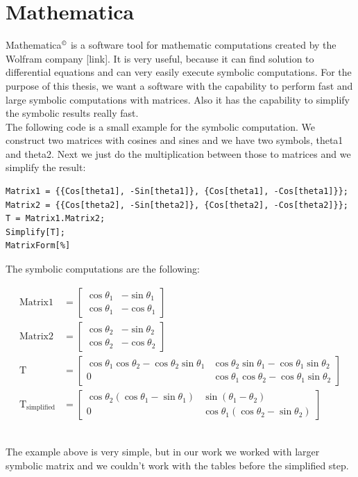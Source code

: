 \section{Mathematica}
Mathematica$^{\textrm{\copyright}}$ is a software tool for mathematic computations created by the Wolfram company [link]. It is very useful, because it can find solution to differential equations and can very easily execute symbolic computations. For the purpose of this thesis, we want a software with the capability to perform fast and large symbolic computations with matrices. Also it has the capability to simplify the symbolic results really fast. \\
The following code is a small example for the symbolic computation. We construct two matrices with cosines and sines and we have two symbols, theta1 and theta2. Next we just do the multiplication between those to matrices and we simplify the result:
\begin{scriptsize}
\begin{verbatim}
Matrix1 = {{Cos[theta1], -Sin[theta1]}, {Cos[theta1], -Cos[theta1]}};
Matrix2 = {{Cos[theta2], -Sin[theta2]}, {Cos[theta2], -Cos[theta2]}};
T = Matrix1.Matrix2;
Simplify[T];
MatrixForm[%]
\end{verbatim}
\end{scriptsize}
The symbolic computations are the following:
\begin{small}
\begin{align*}
\text{Matrix1} &= \begin{bmatrix}
\cos\theta_1 & -\sin\theta_1\\
\cos\theta_1 & -\cos\theta_1
\end{bmatrix}\\
\text{Matrix2} &= \begin{bmatrix}
\cos\theta_2 & -\sin\theta_2\\
\cos\theta_2 & -\cos\theta_2
\end{bmatrix}\\
\text{T} &= \begin{bmatrix}
\cos\theta_1\cos\theta_2 - \cos\theta_2\sin\theta_1 &   \cos\theta_2 \sin\theta_1 - \cos\theta_1 \sin\theta_2\\
0 & \cos\theta_1 \cos\theta_2 - \cos\theta_1 \sin\theta_2
\end{bmatrix}\\
\text{T}_{\text{simplified}} &= \begin{bmatrix}
\cos\theta_2\left(\cos\theta_1 - \sin\theta_1\right) & \sin\left(\theta_1 - \theta_2\right)\\
 0 & \cos\theta_1 \left(\cos\theta_2 - \sin\theta_2\right)
\end{bmatrix}
\end{align*}\\
\end{small}
The example above is very simple, but in our work we worked with larger symbolic matrix and we couldn't work with the tables before the simplified step.